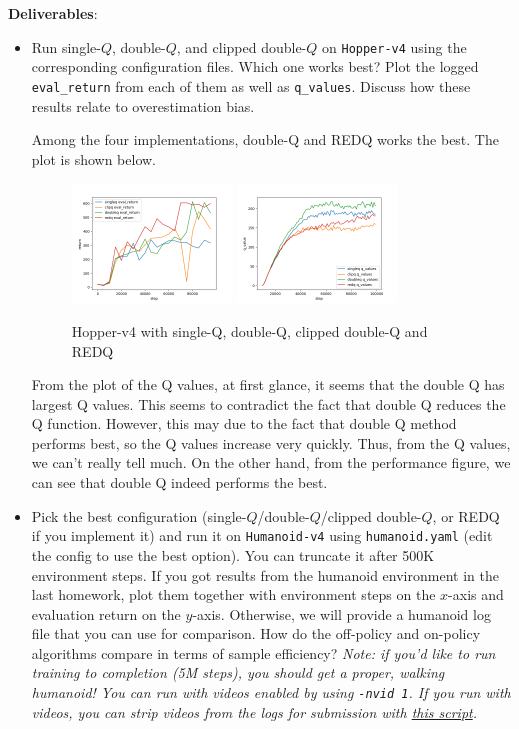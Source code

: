 \textbf{Deliverables}:
\begin{itemize}
    \item Run single-$Q$, double-$Q$, and clipped double-$Q$ on \verb|Hopper-v4| using the corresponding configuration files. Which one works best? Plot the logged \verb|eval_return| from each of them as well as \verb|q_values|. Discuss how these results relate to overestimation bias.
    
\MYSOLUTION Among the four implementations, double-Q and REDQ works the best. The plot is shown below.

\begin{figure}[H]
    \centering
    \includegraphics[width=0.4\textwidth]{../report/assets/P3-1-5-1.png}
    \includegraphics[width=0.4\textwidth]{../report/assets/P3-1-5-2.png}
    \caption{Hopper-v4 with single-Q, double-Q, clipped double-Q and REDQ}
    \label{fig:hopper-v4-q}
\end{figure}

From the plot of the Q values, at first glance, it seems that the double Q has largest Q values. This seems to contradict the fact that double Q reduces the Q function. However, this may due to the fact that double Q method performs best, so the Q values increase very quickly. Thus, from the Q values, we can't really tell much. On the other hand, from the performance figure, we can see that double Q indeed performs the best.

    \item Pick the best configuration (single-$Q$/double-$Q$/clipped double-$Q$, or REDQ if you implement it) and run it on \verb|Humanoid-v4| using \verb|humanoid.yaml| (edit the config to use the best option). You can truncate it after 500K environment steps. If you got results from the humanoid environment in the last homework, plot them together with environment steps on the $x$-axis and evaluation return on the $y$-axis. Otherwise, we will provide a humanoid log file that you can use for comparison. How do the off-policy and on-policy algorithms compare in terms of sample efficiency? \textit{Note: if you'd like to run training to completion (5M steps), you should get a proper, walking humanoid! You can run with videos enabled by using \texttt{-nvid 1}. If you run with videos, you can strip videos from the logs for submission with \href{https://gist.github.com/kylestach/e9964f5f34ee74367547dec83eaf5fae}{this script}.}
    

\end{itemize}

